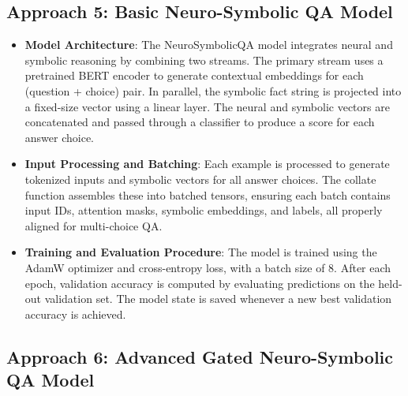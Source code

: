 \documentclass[10.5pt]{article}
\begin{document}
\subsection{Approach 5: Basic Neuro-Symbolic QA Model}
\begin{itemize}
    \item \textbf{Model Architecture}: The NeuroSymbolicQA model integrates neural and symbolic reasoning by combining two streams. The primary stream uses a pretrained BERT encoder to generate contextual embeddings for each (question + choice) pair. In parallel, the symbolic fact string is projected into a fixed-size vector using a linear layer. The neural and symbolic vectors are concatenated and passed through a classifier to produce a score for each answer choice.
    
    \item \textbf{Input Processing and Batching}: Each example is processed to generate tokenized inputs and symbolic vectors for all answer choices. The collate function assembles these into batched tensors, ensuring each batch contains input IDs, attention masks, symbolic embeddings, and labels, all properly aligned for multi-choice QA.
    
    \item \textbf{Training and Evaluation Procedure}: The model is trained using the AdamW optimizer and cross-entropy loss, with a batch size of 8. After each epoch, validation accuracy is computed by evaluating predictions on the held-out validation set. The model state is saved whenever a new best validation accuracy is achieved.

\end{itemize}


\subsection{Approach 6: Advanced Gated Neuro-Symbolic QA Model}
 
\end{document}

